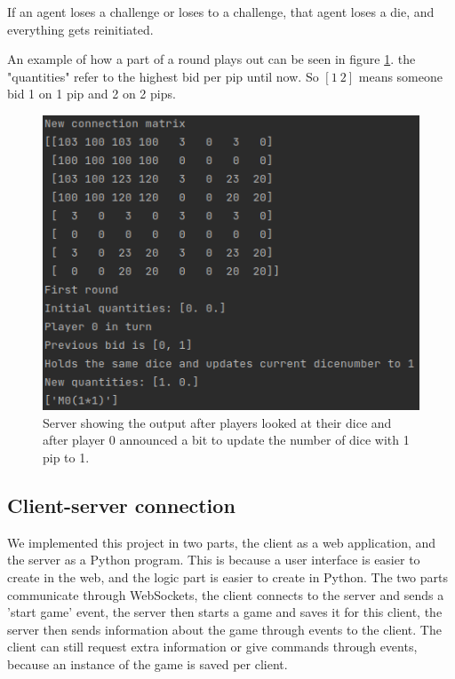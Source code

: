 \documentclass{article}
\begin{document}
If an agent loses a challenge or loses to a challenge, that agent loses a die, and everything gets reinitiated.


An example of how a part of a round plays out can be seen in figure \ref{fig:halfaround}. the "quantities" refer to the highest bid per pip until now. So $[1\ 2]$ means someone bid 1 on 1 pip and 2 on 2 pips.
\begin{figure}[h!]
    \centering
    \includegraphics[width=.6\textwidth]{img/halfaround.png}
    \caption{Server showing the output after players looked at their dice and after player 0 announced a bit to update the number of dice with 1 pip to 1.}
    \label{fig:halfaround}
\end{figure}

\subsection*{Client-server connection} %
We implemented this project in two parts, the client as a web application, and the server as a Python program. This is because a user interface is easier to create in the web, and the logic part is easier to create in Python. The two parts communicate through WebSockets, the client connects to the server and sends a 'start game' event, the server then starts a game and saves it for this client, the server then sends information about the game through events to the client. The client can still request extra information or give commands through events, because an instance of the game is saved per client. 
\end{document}
